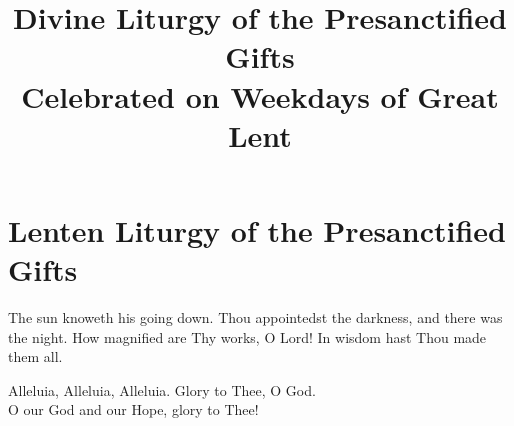 \documentclass[twoside, letterpaper, 12pt]{report}
\title{Divine Liturgy of the Presanctified Gifts\\
       Celebrated on Weekdays of Great Lent}
\date{}%
\author{}
\begin{document}
\maketitle
\pagestyle{empty} %


\cleardoublepage
\pagestyle{plain}
\setcounter{page}{1}

\chapter*{Lenten Liturgy of the Presanctified Gifts}

\priestline{\blessedisthekingdom}


\peopleline{\comeletusworship}

\begin{maybetwocolumns}
  


  The sun knoweth his going down. Thou appointedst the darkness, and there was the night.
  How magnified are Thy works, O Lord! In wisdom hast Thou made them all.
\end{maybetwocolumns}

\begin{reader}
  \item \gne
  \item Alleluia, Alleluia, Alleluia. Glory to Thee, O God. \thrice\\
        O our God and our Hope, glory to Thee!
\end{reader}
\end{document}
